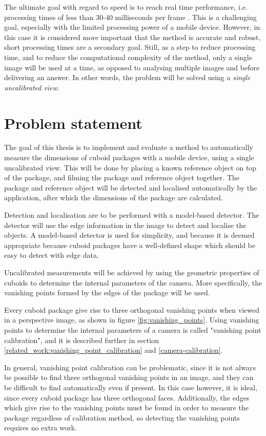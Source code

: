 The ultimate goal with regard to speed is to reach real time performance, i.e. processing times of less than 30-40 milliseconds per frame \cite{pulli2012real}.
This is a challenging goal, especially with the limited processing power of a mobile device.
However, in this case it is considered more important that the method is accurate and robust, short processing times are a secondary goal.
Still, as a step to reduce processing time, and to reduce the computational complexity of the method, only a single image will be used at a time, as opposed to analysing multiple images and before delivering an answer.
In other words, the problem will be solved using a \textit{single uncalibrated view}.

\section{Problem statement}\label{problem-statement}
The goal of this thesis is to implement and evaluate a method to automatically measure the dimensions of cuboid packages with a mobile device, using a single uncalibrated view.
This will be done by placing a known reference object on top of the package, and filming the package and reference object together.
The package and reference object will be detected and localised automatically by the application, after which the dimensions of the package are calculated.

Detection and localisation are to be performed with a model-based detector.
The detector will use the edge information in the image to detect and localise the objects.
A model-based detector is used for simplicity, and because it is deemed appropriate because cuboid packages have a well-defined shape which should be easy to detect with edge data.

Uncalibrated measurements will be achieved by using the geometric properties of cuboids to determine the internal parameters of the camera. More specifically, the vanishing points formed by the edges of the package will be used.

Every cuboid package give rise to three orthogonal vanishing points when viewed in a perspective image, as shown in figure \ref{fig:vanishing_points}.
Using vanishing points to determine the internal parameters of a camera is called "vanishing point calibration", and it is described further in section \ref{related_work:vanishing_point_calibration} and \ref{camera-calibration}.

In general, vanishing point calibration can be problematic, since it is not always be possible to find three orthogonal vanishing points in an image, and they can be difficult to find automatically even if present.
In this case however, it is ideal, since every cuboid package has three orthogonal faces.
Additionally, the edges which give rise to the vanishing points must be found in order to measure the package regardless of calibration method, so detecting the vanishing points requires no extra work.

